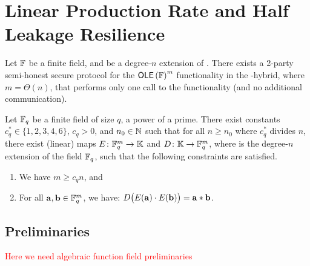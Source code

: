 \section{Linear Production Rate and Half Leakage Resilience}

\begin{theorem}
	\label{thm:embed-low}
	Let ${\mathbb F}$ be a finite field, and \bbK be a degree-$n$ extension of \bbF. 
	There exists a 2-party semi-honest secure protocol for the $\OLE[\bbF]^m$ functionality in the \OLE[\bbK]-hybrid, where $m=\Theta(n)$, that performs only one call to the \OLE[\bbK] functionality (and no additional communication). 
\end{theorem}

\begin{theorem}
	\label{thm:embed}
	Let ${\mathbb F}_q$ be a finite field of size $q$, a power of a prime. 
	There exist constants $c_q^* \in \{1,2,3,4,6\}$, $c_q > 0$, and $n_0 \in {\mathbb N}$ such that for all $n \geq n_0$ where $c_q^*$ divides $n$, there exist (linear) maps $E \colon {\mathbb F}^m_{q} \rightarrow {\mathbb K}$ and $D\colon {\mathbb K} \rightarrow {\mathbb F}^m_{q}$, where \bbK is the degree-$n$ extension of the field ${\mathbb F}_q$, such that the following constraints are satisfied.
	\begin{enumerate}
		\item We have $m \geq c_qn$, and
		\item For all ${\mathbf a}, {\mathbf b} \in {\mathbb F}_{q}^m$, we have: 
		$D\big( E({\mathbf a})\cdot E({\mathbf b}) \big) = {\mathbf a}*{\mathbf b}$. 
	\end{enumerate}
\end{theorem}

\subsection{Preliminaries}
\textcolor{red}{Here we need algebraic function field preliminaries}